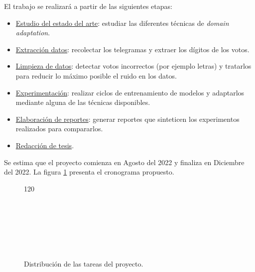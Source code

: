 \documentclass[a4paper, twoside]{report}
\begin{document}
El trabajo se realizar\'a a partir de las siguientes etapas:
\begin{itemize}
	\item \underline{Estudio del estado del arte}: estudiar las diferentes t\'ecnicas
	      de {\it domain adaptation}.
	\item \underline{Extracci\'on datos}: recolectar los telegramas
	      y extraer los d\'igitos de los votos.
	\item \underline{Limpieza de datos}: detectar votos incorrectos (por ejemplo
	      letras) y tratarlos para reducir lo m\'aximo posible el ruido
	      en los datos.
	\item \underline{Experimentaci\'on}: realizar ciclos de entrenamiento de modelos
	      y adaptarlos mediante alguna de las t\'ecnicas disponibles.
	\item \underline{Elaboraci\'on de reportes}: generar reportes que sinteticen los
	      experimentos realizados para compararlos.
	\item \underline{Redacci\'on de tesis}.
\end{itemize}

Se estima que el proyecto comienza en Agosto del 2022 y finaliza en Diciembre del 2022. La figura \ref{fig:gantt}
presenta el cronograma propuesto.

\begin{figure}[ht]
	\begin{center}

		\begin{ganttchart}[y unit title=0.4cm,
				y unit chart=0.5cm,
				vgrid,hgrid,
				title label anchor/.style={below=-1.6ex},
				title left shift=.05,
				title right shift=-.05,
				title height=1,
				progress label text={},
				bar height=0.7,
				group right shift=0,
				group top shift=.6,
				group height=.3]{1}{20}
			\\
			\\

			 \\
			 \\
			 \\
			 \\
			 \\

		\end{ganttchart}
	\end{center}
	\caption{Distribuci\'on de las tareas del proyecto.}
	\label{fig:gantt}
\end{figure}
\end{document}
